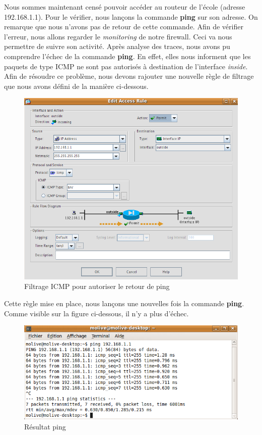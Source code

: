 \documentclass[a4paper,12pt]{article}
\begin{document}
\newpage
Nous sommes maintenant censé pouvoir accéder au routeur de l'école (adresse 192.168.1.1). Pour le vérifier, nous lançons la commande \textbf{ping} sur son adresse. On remarque que nous n'avons pas de retour de cette commande. Afin de vérifier l'erreur, nous allons regarder le \textit{monitoring} de notre firewall. Ceci va nous permettre de suivre son activité. Après analyse des traces, nous avons pu comprendre l'échec de la commande \textbf{ping}. En effet, elles nous informent que les paquets de type ICMP ne sont pas autorisés à destination de l'interface \textit{inside}. Afin de résoudre ce problème, nous devons rajouter une nouvelle règle de filtrage que nous avons défini de la manière ci-dessous.
\begin{figure}[H]
	\center
	\includegraphics[width=13cm]{img/8-Pingrevientpasflitrageicmp.png}
	\caption{Filtrage ICMP pour autoriser le retour de ping}
\end{figure}

Cette règle mise en place, nous lançons une nouvelles fois la commande \textbf{ping}. Comme visible sur la figure ci-dessous, il n'y a plus d'échec.
\begin{figure}[H]
	\center
	\includegraphics[width=13cm]{img/9-pingok.png}
	\caption{Résultat ping}
\end{figure}
\end{document}
